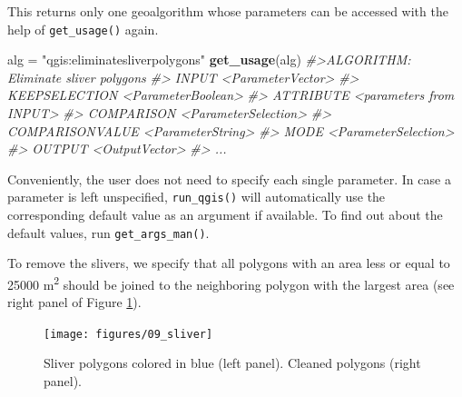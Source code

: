 \documentclass[]{krantz}
\newenvironment{Shaded}{\begin{snugshade}}{\end{snugshade}}
\newcommand{\CommentTok}[1]{\textcolor[rgb]{0.37,0.37,0.37}{\textit{#1}}}
\newcommand{\DataTypeTok}[1]{\textcolor[rgb]{0.27,0.27,0.27}{#1}}
\newcommand{\DecValTok}[1]{\textcolor[rgb]{0.06,0.06,0.06}{#1}}
\newcommand{\KeywordTok}[1]{\textcolor[rgb]{0.27,0.27,0.27}{\textbf{#1}}}
\newcommand{\NormalTok}[1]{#1}
\newcommand{\OtherTok}[1]{\textcolor[rgb]{0.37,0.37,0.37}{#1}}
\newcommand{\StringTok}[1]{\textcolor[rgb]{0.5,0.5,0.5}{#1}}
\begin{document}
This returns only one geoalgorithm whose parameters can be accessed with the help of \texttt{get\_usage()} again.

\begin{Shaded}
\begin{Highlighting}[]
\NormalTok{alg =}\StringTok{ "qgis:eliminatesliverpolygons"}
\KeywordTok{get_usage}\NormalTok{(alg)}
\CommentTok{#>ALGORITHM: Eliminate sliver polygons}
\CommentTok{#>  INPUT <ParameterVector>}
\CommentTok{#>  KEEPSELECTION <ParameterBoolean>}
\CommentTok{#>  ATTRIBUTE <parameters from INPUT>}
\CommentTok{#>  COMPARISON <ParameterSelection>}
\CommentTok{#>  COMPARISONVALUE <ParameterString>}
\CommentTok{#>  MODE <ParameterSelection>}
\CommentTok{#>  OUTPUT <OutputVector>}
\CommentTok{#>  ...}
\end{Highlighting}
\end{Shaded}

Conveniently, the user does not need to specify each single parameter.
In case a parameter is left unspecified, \texttt{run\_qgis()} will automatically use the corresponding default value as an argument if available.
To find out about the default values, run \texttt{get\_args\_man()}.

To remove the slivers, we specify that all polygons with an area less or equal to 25000 m\textsuperscript{2} should be joined to the neighboring polygon with the largest area (see right panel of Figure \ref{fig:sliver-fig}).

\begin{Shaded}
\end{Shaded}

\begin{figure}[t]

{\centering \texttt{[image: figures/09\_sliver]} 

}

\caption[Sliver (left panel) and cleaned (right panel) polygons.]{Sliver polygons colored in blue (left panel). Cleaned polygons (right panel).}\label{fig:sliver-fig}
\end{figure}
\end{document}
